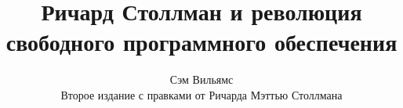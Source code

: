 \documentclass[10pt]{book}
\begin{document}
\title{Ричард Столлман и революция свободного программного обеспечения}
\author{Сэм Вильямс \\ Второе издание с правками от Ричарда Мэттью Столлмана}
\date{}

\maketitle

\begin{sloppypar}

\thispagestyle{empty}
\frontmatter

\thispagestyle{empty}
\tableofcontents

\pagestyle{fancy}
\renewcommand{\chaptermark}[1]{%
\markboth{\MakeUppercase{#1}}{}}




\mainmatter

\renewcommand{\chaptermark}[1]{%
\markboth{\MakeUppercase{%
\chaptername\ \thechapter.%
\ #1}}{}}















\backmatter

\renewcommand{\chaptermark}[1]{%
\markboth{\MakeUppercase{#1}}{}}




\printindex

\end{sloppypar}
\end{document}
